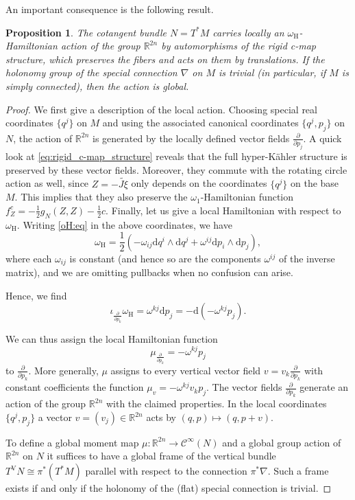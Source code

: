 \documentclass{article}
\newtheorem{proposition}[theorem]{Proposition}
\theoremstyle{definition}
\newcommand{\R}{\mathbb{R}}
\newcommand{\calC}{\mathcal{C}}
\newcommand{\hor}{\mathrm{H}}
\newcommand{\ver}{\mathrm{V}}
\newcommand{\pd}[2]{\frac{\partial #1}{\partial #2}}
\renewcommand{\d}{\mathrm{d}}
\begin{document}
	An important consequence is the following result.
	
	\begin{proposition}\label{translations:prop}
		The cotangent bundle $N=T^*M$ carries locally an $\omega_\hor$-Hamiltonian action of the group $\R^{2n}$ by automorphisms of the rigid c-map structure, which preserves the fibers and acts on them by translations. If the holonomy group of the special connection $\nabla$ on $M$ is trivial (in particular, if $M$ is simply connected), then the action is global.
	\end{proposition}

	\begin{proof}
		We first give a description of the local action. Choosing special real coordinates $\{q^j\}$ on $M$ and using the associated canonical coordinates $\{q^j,p_j\}$ on $N$, the action of $\R^{2n}$ is generated by the locally defined vector fields $\pd{}{p_j}$. A quick look at \eqref{eq:rigid_c-map_structure} reveals that the full hyper-K\"ahler structure is preserved by these vector fields. Moreover, they commute with the rotating circle action as well, since $Z=-\widetilde{J\xi}$ only depends on the coordinates $\{q^j\}$ on the base $M$. This implies that they also preserve the $\omega_1$-Hamiltonian function $f_Z^c=-\frac{1}{2}g_N(Z,Z)-\frac{1}{2}c$. Finally, let us give a local Hamiltonian with respect to $\omega_\hor$. Writing \eqref{oH:eq} in the above coordinates, we have $$\omega_\hor=\frac{1}{2}(-\omega_{ij}\d q^i\wedge\d q^j+\omega^{ij}\d p_i\wedge \d p_j),$$ where each $\omega_{ij}$ is constant (and hence so are the components $\omega^{ij}$ of the inverse matrix), and we are omitting pullbacks when no confusion can arise.\medskip
  
        Hence, we find $$\iota_{\pd{}{p_k}}\omega_\hor=\omega^{kj}\d p_j=-\d(-\omega^{kj}p_j).$$
		
		We can thus assign the local Hamiltonian function \begin{equation}\label{eq:mu_R2n}
			\mu_{\pd{}{p_k}}=-\omega^{kj}p_j
		\end{equation} to $\pd{}{p_k}$. More generally, $\mu$ assigns to every vertical vector field $v=v_k\pd{}{p_k}$ with constant coefficients the function $\mu_v=-\omega^{kj}v_kp_j$. The vector fields $\pd{}{p_k}$ generate an action of the group $\R^{2n}$ with the claimed properties. In the local coordinates $\{q^j,p_j\}$ a vector $v=(v_j)\in\R^{2n}$ acts by $(q,p)\longmapsto(q,p+v)$.\medskip
	
		To define a global moment map $\mu:\R^{2n}\longrightarrow\calC^\infty(N)$ and a global group action of $\R^{2n}$ on $N$ it suffices to have a global frame of the vertical bundle $T^\ver N\cong\pi^*(T^*M)$ parallel with respect to the connection $\pi^*\nabla$. Such a frame exists if and only if the holonomy of the (flat) special connection is trivial.
	\end{proof}
\end{document}
